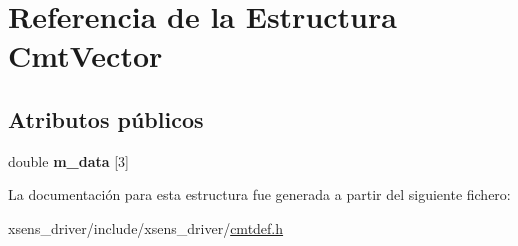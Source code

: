 \hypertarget{structCmtVector}{\section{\-Referencia de la \-Estructura \-Cmt\-Vector}
\label{structCmtVector}
}
\subsection*{\-Atributos públicos}
\begin{DoxyCompactItemize}
\item 
\hypertarget{structCmtVector_a97c9fe257d126ae4fec3a20adda034c4}{double {\bfseries m\-\_\-data} \mbox{[}3\mbox{]}}\label{structCmtVector_a97c9fe257d126ae4fec3a20adda034c4}

\end{DoxyCompactItemize}


\-La documentación para esta estructura fue generada a partir del siguiente fichero\-:\begin{DoxyCompactItemize}
\item 
xsens\-\_\-driver/include/xsens\-\_\-driver/\hyperlink{cmtdef_8h}{cmtdef.\-h}\end{DoxyCompactItemize}
